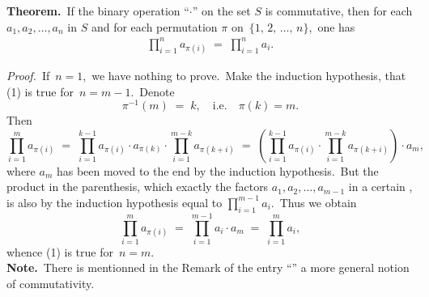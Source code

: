 \documentclass[12pt]{article}
\theoremstyle{definition}
\begin{document}
\textbf{Theorem.}\, If the binary operation ``$\cdot$'' on the set $S$ is commutative, then for each\, 
$a_1, a_2,\ldots,a_n$ in $S$ and for each permutation $\pi$ on\, $\{1,\,2,\,\ldots,\,n\}$,\, one has
\begin{align}
\prod_{i=1}^na_{\pi(i)} \;=\; \prod_{i=1}^na_i.
\end{align}

\emph{Proof.}\, If\, $n = 1$,\, we have nothing to prove.\, 
Make the induction hypothesis, that (1) is true for\, 
$n = m\!-\!1$.\, Denote
$$\pi^{-1}(m) \;=\; k, \quad \mbox{i.e.} \quad \pi(k) = m.$$
Then
$$\prod_{i=1}^ma_{\pi(i)} \;=\; 
\prod_{i=1}^{k-1}a_{\pi(i)}\cdot a_{\pi(k)}\cdot\prod_{i=1}^{m-k}a_{\pi(k+i)} \;=\;
\left(\prod_{i=1}^{k-1}a_{\pi(i)}\cdot\prod_{i=1}^{m-k}a_{\pi(k+i)}\right)\cdot a_m,$$
where $a_m$ has been moved to the end by the induction 
hypothesis.\, But the product in the parenthesis, which 
 exactly the factors 
$a_1, a_2, \ldots, a_{m-1}$ in a certain , is also by the induction hypothesis equal to $\prod_{i=1}^{m-1}a_i$.\, Thus we obtain
$$\prod_{i=1}^ma_{\pi(i)} \;=\; \prod_{i=1}^{m-1}a_i\cdot a_m \;=\; \prod_{i=1}^ma_i,$$ 
whence (1) is true for\, $n = m$.\\

\textbf{Note.}\, There is mentionned in the Remark of the entry ``'' a more general notion of commutativity.

\end{document}
